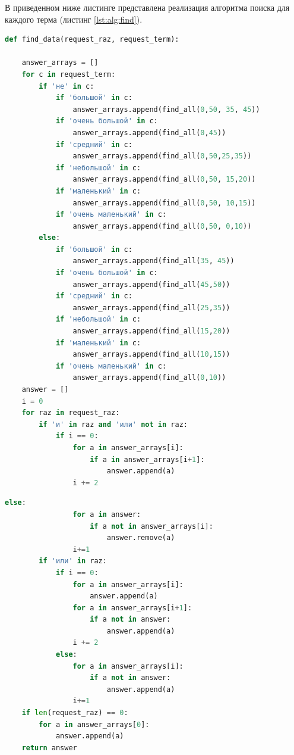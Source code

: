 В приведенном ниже листинге представлена реализация алгоритма поиска для каждого терма (листинг \ref{lst:alg:find}).
        \par \text{           }
        \begin{lstlisting}[language=Python, label=lst:alg:find, caption=Реализация алгоритма поиска по термам]
def find_data(request_raz, request_term):

    answer_arrays = []
    for c in request_term:
        if 'не' in c:
            if 'большой' in c:
                answer_arrays.append(find_all(0,50, 35, 45))
            if 'очень большой' in c:
                answer_arrays.append(find_all(0,45))
            if 'средний' in c:
                answer_arrays.append(find_all(0,50,25,35))
            if 'небольшой' in c:
                answer_arrays.append(find_all(0,50, 15,20))
            if 'маленький' in c:
                answer_arrays.append(find_all(0,50, 10,15))
            if 'очень маленький' in c:
                answer_arrays.append(find_all(0,50, 0,10))
        else:
            if 'большой' in c:
                answer_arrays.append(find_all(35, 45))
            if 'очень большой' in c:
                answer_arrays.append(find_all(45,50))
            if 'средний' in c:
                answer_arrays.append(find_all(25,35))
            if 'небольшой' in c:
                answer_arrays.append(find_all(15,20))
            if 'маленький' in c:
                answer_arrays.append(find_all(10,15))
            if 'очень маленький' in c:
                answer_arrays.append(find_all(0,10))
    answer = []
    i = 0
    for raz in request_raz:
        if 'и' in raz and 'или' not in raz:
            if i == 0:
                for a in answer_arrays[i]:
                    if a in answer_arrays[i+1]:
                        answer.append(a)
                i += 2
\end{lstlisting}
        \par \text{           }
        \begin{lstlisting}[language=Python, label=lst:alg:find1, caption=Реализация алгоритма поиска по термам]
            else:
                for a in answer:
                    if a not in answer_arrays[i]:
                        answer.remove(a)
                i+=1
        if 'или' in raz:
            if i == 0:
                for a in answer_arrays[i]:
                    answer.append(a)
                for a in answer_arrays[i+1]:
                    if a not in answer:
                        answer.append(a)
                i += 2
            else:
                for a in answer_arrays[i]:
                    if a not in answer:
                        answer.append(a)
                i+=1
    if len(request_raz) == 0:
        for a in answer_arrays[0]:
            answer.append(a)
    return answer
\end{lstlisting}
